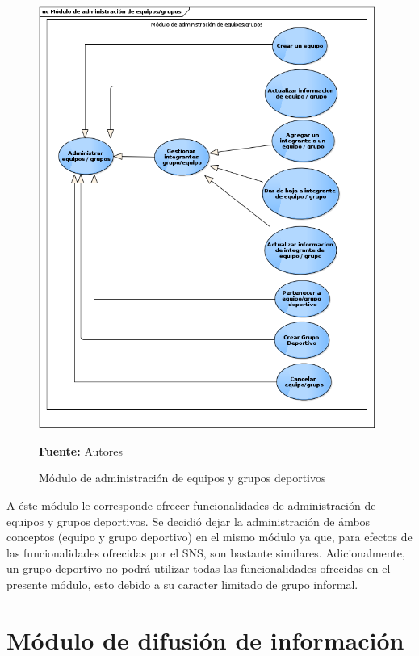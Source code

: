 \begin{figure}[!htb]
  \begin{center}
    \includegraphics[width=11cm]{./imagenes/casos_uso/gestion_equipo_grupo.png}
    \caption{Módulo de administración de equipos y grupos deportivos}
    \label{fig:cu_admin_equip_grup}
    \textbf{Fuente:} Autores \\
  \end{center}
\end{figure}

A éste módulo le corresponde ofrecer funcionalidades de administración de equipos y grupos deportivos. Se decidió dejar la administración de ámbos conceptos (equipo y grupo deportivo) en el mismo módulo ya que, para efectos de las funcionalidades ofrecidas por el SNS, son bastante similares. Adicionalmente, un grupo deportivo no podrá utilizar todas las funcionalidades ofrecidas en el presente módulo, esto debido a su caracter limitado de grupo informal.

\section{Módulo de difusión de información}


